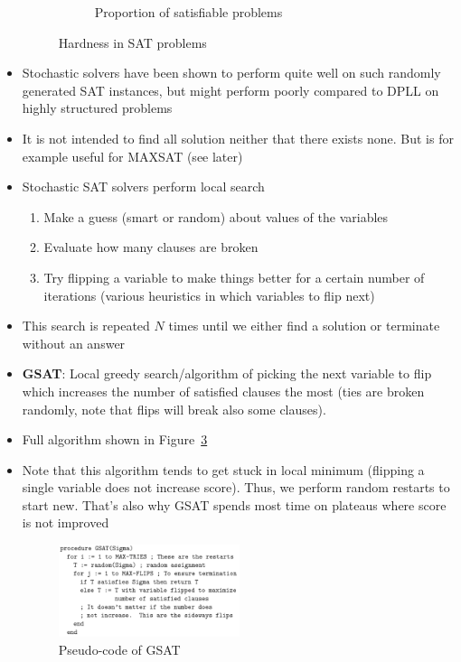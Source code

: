 \begin{itemize}
\begin{figure}[ht!]
\begin{subfigure}[b]{0.4\textwidth}
			\caption{Proportion of satisfiable problems}
			\label{fig:kr_sat_prob_hardness_2}
		\end{subfigure}
		\caption{Hardness in SAT problems}
		\label{fig:kr_sat_prob_hardness}
	\end{figure}
	\item Stochastic solvers have been shown to perform quite well on such randomly generated SAT instances, but might perform poorly compared to DPLL on highly structured problems
	\item It is not intended to find all solution neither that there exists none. But is for example useful for MAXSAT (see later)
	\item Stochastic SAT solvers perform local search 
	\begin{enumerate}
		\item Make a guess (smart or random) about values of the variables
		\item Evaluate how many clauses are broken
		\item Try flipping a variable to make things better for a certain number of iterations (various heuristics in which variables to flip next)
	\end{enumerate}
	\item This search is repeated $N$ times until we either find a solution or terminate without an answer
	\item \textbf{GSAT}: Local greedy search/algorithm of picking the next variable to flip which increases the number of satisfied clauses the most (ties are broken randomly, note that flips will break also some clauses).
	\item Full algorithm shown in Figure~\ref{fig:kr_sat_prob_GSAT}
	\item Note that this algorithm tends to get stuck in local minimum (flipping a single variable does not increase score). Thus, we perform random restarts to start new. That's also why GSAT spends most time on plateaus where score is not improved
	\begin{figure}[ht!]
		\centering
		\includegraphics[width=0.5\textwidth]{figures/kr_sat_prob_GSAT.png}
		\caption{Pseudo-code of GSAT}
		\label{fig:kr_sat_prob_GSAT}
	\end{figure}
\end{itemize}

